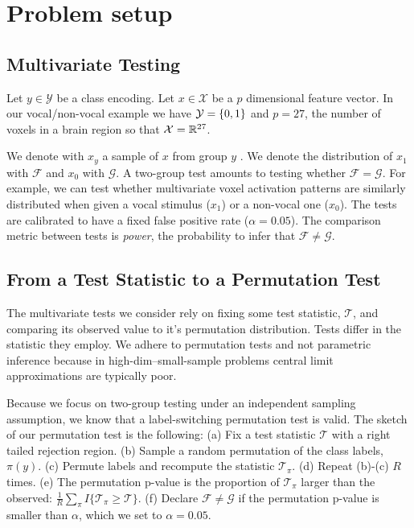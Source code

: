 \documentclass[oupdraft]{bio}
\begin{document}




\section{Problem setup}
\label{sec:problem_setup}


\subsection{Multivariate Testing}

Let $y \in \mathcal{Y}$ be a class encoding. 
Let $x \in \mathcal{X}$ be a $p$ dimensional feature vector. 
In our vocal/non-vocal example we have $\mathcal{Y}=\{ 0,1 \}$ and $p=27$, the number of voxels in a brain region so that $\mathcal{X}=\mathbb{R}^{27}$. 

We denote with $x_y$ a sample of $x$ from group $y$ .
We denote the distribution of $x_1$ with $\mathcal{F}$ and $x_0$ with $\mathcal{G}$.
A two-group test amounts to testing whether $\mathcal{F}=\mathcal{G}$.
For example, we can test whether multivariate voxel activation patterns are similarly distributed when given a vocal stimulus ($x_1$) or a non-vocal one ($x_0$).
The tests are calibrated to have a fixed false positive rate ($\alpha=0.05$).
The comparison metric between tests is \emph{power}, the probability to infer that $\mathcal{F}\neq\mathcal{G}$.


\subsection{From a Test Statistic to a Permutation Test}

The multivariate tests we consider rely on fixing some test statistic, $\mathcal{T}$, and comparing its observed value to it's permutation distribution. 
Tests differ in the statistic they employ.
We adhere to permutation tests and not parametric inference because in high-dim--small-sample problems central limit approximations are typically poor.

Because we focus on two-group testing under an independent sampling assumption, we know that a label-switching permutation test is valid. 
The sketch of our permutation test is the following: \newline
(a) Fix a test statistic $\mathcal{T}$ with a right tailed rejection region. \newline
(b) Sample a random permutation of the class labels, $\pi(y)$. \newline
(c) Permute labels and recompute the statistic $\mathcal{T}_\pi$. \newline
(d) Repeat (b)-(c) $R$ times. \newline
(e) The permutation p-value is the proportion of  $\mathcal{T}_\pi$ larger than the observed: 
$\frac{1}{R} \sum_{\pi} I\{\mathcal{T}_\pi \geq \mathcal{T}\}$.\newline
(f) Declare $\mathcal{F}\neq \mathcal{G}$ if the permutation p-value is smaller than $\alpha$, which we set to $\alpha=0.05$.
\bigskip
\end{document}
